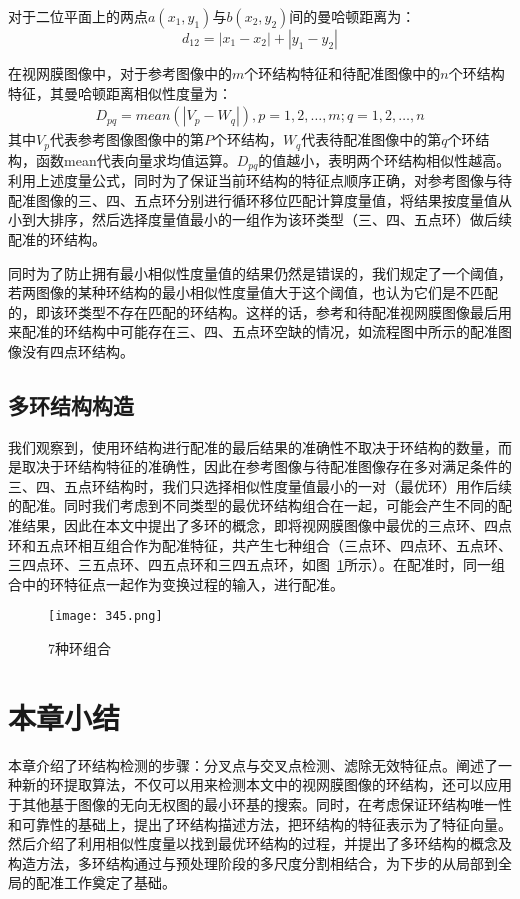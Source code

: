 对于二位平面上的两点$a(x_1,y_1)$与$b(x_2,y_2)$间的曼哈顿距离为：
\begin{equation}
d_{12}=|x_1-x_2|+|y_1-y_2|
\end{equation}
	 	
在视网膜图像中，对于参考图像中的$m$个环结构特征和待配准图像中的$n$个环结构特征，其曼哈顿距离相似性度量为：
\begin{align}
D_{pq} = mean(|V_p-W_q|), p = 1, 2, \ldots, m; q = 1, 2, \ldots, n
\end{align}	 	
其中$V_p$代表参考图像图像中的第$P$个环结构，$W_q$代表待配准图像中的第$q$个环结构，函数mean代表向量求均值运算。$D_{pq}$的值越小，表明两个环结构相似性越高。利用上述度量公式，同时为了保证当前环结构的特征点顺序正确，对参考图像与待配准图像的三、四、五点环分别进行循环移位匹配计算度量值，将结果按度量值从小到大排序，然后选择度量值最小的一组作为该环类型（三、四、五点环）做后续配准的环结构。
 
同时为了防止拥有最小相似性度量值的结果仍然是错误的，我们规定了一个阈值，若两图像的某种环结构的最小相似性度量值大于这个阈值，也认为它们是不匹配的，即该环类型不存在匹配的环结构。这样的话，参考和待配准视网膜图像最后用来配准的环结构中可能存在三、四、五点环空缺的情况，如流程图中所示的配准图像没有四点环结构。

\subsection{多环结构构造}
我们观察到，使用环结构进行配准的最后结果的准确性不取决于环结构的数量，而是取决于环结构特征的准确性，因此在参考图像与待配准图像存在多对满足条件的三、四、五点环结构时，我们只选择相似性度量值最小的一对（最优环）用作后续的配准。同时我们考虑到不同类型的最优环结构组合在一起，可能会产生不同的配准结果，因此在本文中提出了多环的概念，即将视网膜图像中最优的三点环、四点环和五点环相互组合作为配准特征，共产生七种组合（三点环、四点环、五点环、三四点环、三五点环、四五点环和三四五点环，如图~\ref{345}所示）。在配准时，同一组合中的环特征点一起作为变换过程的输入，进行配准。
   \begin{figure}[ht!]
   \centering
  \texttt{[image: 345.png]}
  \caption{7种环组合}
    \label{345}
 \end{figure}

\section{本章小结}
本章介绍了环结构检测的步骤：分叉点与交叉点检测、滤除无效特征点。阐述了一种新的环提取算法，不仅可以用来检测本文中的视网膜图像的环结构，还可以应用于其他基于图像的无向无权图的最小环基的搜索。同时，在考虑保证环结构唯一性和可靠性的基础上，提出了环结构描述方法，把环结构的特征表示为了特征向量。然后介绍了利用相似性度量以找到最优环结构的过程，并提出了多环结构的概念及构造方法，多环结构通过与预处理阶段的多尺度分割相结合，为下步的从局部到全局的配准工作奠定了基础。
